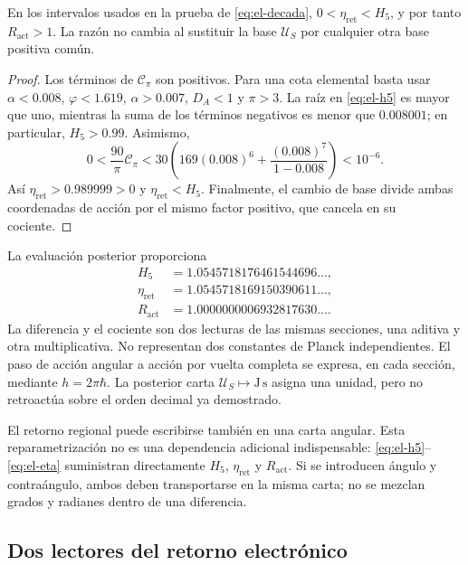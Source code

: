 \begin{proposition}
En los intervalos usados en la prueba de \eqref{eq:el-decada},
\(0<\eta_{\mathrm{ret}}<H_5\), y por tanto
\(R_{\mathrm{act}}>1\). La razón no cambia al sustituir la base
\(\mathcal U_S\) por cualquier otra base positiva común.
\end{proposition}
\begin{proof}
Los términos de \(\mathcal C_\pi\) son positivos. Para una cota
elemental basta usar \(\alpha<0.008\), \(\varphi<1.619\),
\(\alpha>0.007\), \(D_A<1\) y \(\pi>3\). La raíz en
\eqref{eq:el-h5} es mayor que uno, mientras la suma de los términos
negativos es menor que \(0.008001\); en particular, \(H_5>0.99\).
Asimismo,
\[
 0<\frac{90}{\pi}\mathcal C_\pi
 <30\left(169(0.008)^6+
           \frac{(0.008)^7}{1-0.008}\right)<10^{-6}.
\]
Así \(\eta_{\mathrm{ret}}>0.989999>0\) y
\(\eta_{\mathrm{ret}}<H_5\). Finalmente, el cambio de base divide
ambas coordenadas de acción por el mismo factor positivo, que cancela en
su cociente.
\end{proof}

La evaluación posterior proporciona
\begin{align*}
 H_5&=1.0545718176461544696\ldots,\\
 \eta_{\mathrm{ret}}&=1.0545718169150390611\ldots,\\
 R_{\mathrm{act}}&=1.0000000006932817630\ldots.
\end{align*}
La diferencia y el cociente son dos lecturas de las mismas secciones,
una aditiva y otra multiplicativa. No representan dos constantes de
Planck independientes. El paso de acción angular a acción por vuelta
completa se expresa, en cada sección, mediante
\(h=2\pi\hbar\). La posterior carta
\(\mathcal U_S\mapsto\mathrm{J\,s}\) asigna una unidad, pero no
retroactúa sobre el orden decimal ya demostrado.

El retorno regional puede escribirse también en una carta angular.
Esta reparametrización no es una dependencia adicional indispensable:
\eqref{eq:el-h5}--\eqref{eq:el-eta} suministran directamente
\(H_5\), \(\eta_{\mathrm{ret}}\) y \(R_{\mathrm{act}}\). Si se
introducen ángulo y contraángulo, ambos deben transportarse en la misma
carta; no se mezclan grados y radianes dentro de una diferencia.



\subsection{Dos lectores del retorno electrónico}

